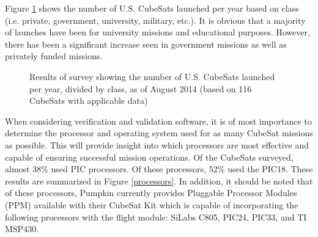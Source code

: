 \documentclass[11pt]{article}
\begin{document}
Figure \ref{classperyear} shows the number of U.S. CubeSats launched per year based on class (i.e. private, government, university, military, etc.).  It is obvious that a majority of launches have been for university missions and educational purposes.  However, there has been a significant increase seen in government missions as well as privately funded missions.  

\begin{figure}[t!]
\centering
{}
\caption{Results of survey showing the number of U.S. CubeSats launched per year, divided by class, as of August 2014 (based on 116 CubeSats with applicable data)}
\label{classperyear}
\end{figure}

When considering verification and validation software, it is of most importance to determine the processor and operating system used for as many CubeSat missions as possible.  This will provide insight into which processors are most effective and capable of ensuring successful mission operations.  Of the CubeSats surveyed, almost 38\% used PIC processors.  Of these processors, 52\% used the PIC18.  These results are summarized in Figure \ref{processors}.  In addition, it should be noted that of these processors, Pumpkin currently provides Pluggable Processor Modules (PPM) available with their CubeSat Kit which is capable of incorporating the following processors with the flight module:  SiLabs C805, PIC24, PIC33, and TI MSP430.  
\end{document}
